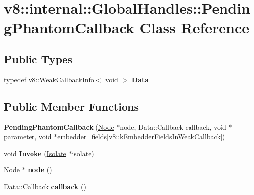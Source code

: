 \hypertarget{classv8_1_1internal_1_1GlobalHandles_1_1PendingPhantomCallback}{}\section{v8\+:\+:internal\+:\+:Global\+Handles\+:\+:Pending\+Phantom\+Callback Class Reference}
\label{classv8_1_1internal_1_1GlobalHandles_1_1PendingPhantomCallback}
\subsection*{Public Types}
\begin{DoxyCompactItemize}
\item 
\mbox{\label{classv8_1_1internal_1_1GlobalHandles_1_1PendingPhantomCallback_a0e7b64641dddbc60790e960bc8069e13}} 
typedef \mbox{\hyperlink{classv8_1_1WeakCallbackInfo}{v8\+::\+Weak\+Callback\+Info}}$<$ void $>$ {\bfseries Data}
\end{DoxyCompactItemize}
\subsection*{Public Member Functions}
\begin{DoxyCompactItemize}
\item 
\mbox{\label{classv8_1_1internal_1_1GlobalHandles_1_1PendingPhantomCallback_a22e64f1cf0791811750181c249b11eeb}} 
{\bfseries Pending\+Phantom\+Callback} (\mbox{\hyperlink{classv8_1_1internal_1_1GlobalHandles_1_1Node}{Node}} $\ast$node, Data\+::\+Callback callback, void $\ast$parameter, void $\ast$embedder\+\_\+fields\mbox{[}v8\+::k\+Embedder\+Fields\+In\+Weak\+Callback\mbox{]})
\item 
\mbox{\label{classv8_1_1internal_1_1GlobalHandles_1_1PendingPhantomCallback_a547f3996ec1b21e93f710185959f490e}} 
void {\bfseries Invoke} (\mbox{\hyperlink{classv8_1_1internal_1_1Isolate}{Isolate}} $\ast$isolate)
\item 
\mbox{\label{classv8_1_1internal_1_1GlobalHandles_1_1PendingPhantomCallback_a976355e3d044d996c85d8c4b16b6107a}} 
\mbox{\hyperlink{classv8_1_1internal_1_1GlobalHandles_1_1Node}{Node}} $\ast$ {\bfseries node} ()
\item 
\mbox{\label{classv8_1_1internal_1_1GlobalHandles_1_1PendingPhantomCallback_ae439acc22ac79736977ef6e9b56ee9fe}} 
Data\+::\+Callback {\bfseries callback} ()
\end{DoxyCompactItemize}


